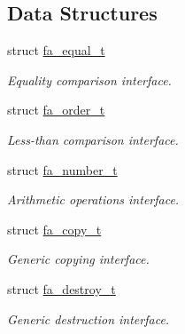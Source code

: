 \subsection*{Data Structures}
\begin{DoxyCompactItemize}
\item 
struct \hyperlink{structfa__equal__t}{fa\-\_\-equal\-\_\-t}
\begin{DoxyCompactList}\small\item\em Equality comparison interface. \end{DoxyCompactList}\item 
struct \hyperlink{structfa__order__t}{fa\-\_\-order\-\_\-t}
\begin{DoxyCompactList}\small\item\em Less-\/than comparison interface. \end{DoxyCompactList}\item 
struct \hyperlink{structfa__number__t}{fa\-\_\-number\-\_\-t}
\begin{DoxyCompactList}\small\item\em Arithmetic operations interface. \end{DoxyCompactList}\item 
struct \hyperlink{structfa__copy__t}{fa\-\_\-copy\-\_\-t}
\begin{DoxyCompactList}\small\item\em Generic copying interface. \end{DoxyCompactList}\item 
struct \hyperlink{structfa__destroy__t}{fa\-\_\-destroy\-\_\-t}
\begin{DoxyCompactList}\small\item\em Generic destruction interface. \end{DoxyCompactList}\end{DoxyCompactItemize}
